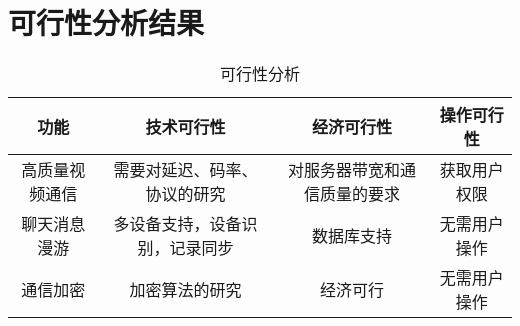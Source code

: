 \chapter{可行性分析结果}
\iffalse
Describe the feasibility analysis results on allocated requirements.

描述对分配需求的可行性分析结果。
\fi
\begin{table}[htbp]
\centering
\caption{可行性分析} \label{tab:tbd_problems}
\begin{tabular}{|c|c|c|c|}
    \hline
    功能 & 技术可行性 & 经济可行性 & 操作可行性  \\
    \hline
    高质量视频通信 & 需要对延迟、码率、协议的研究 & 对服务器带宽和通信质量的要求 & 获取用户权限\\
    \hline
    聊天消息漫游 & 多设备支持，设备识别，记录同步 & 数据库支持 & 无需用户操作\\
    \hline
    通信加密 & 加密算法的研究 & 经济可行 & 无需用户操作  \\
    \hline
\end{tabular}
\end{table} 
